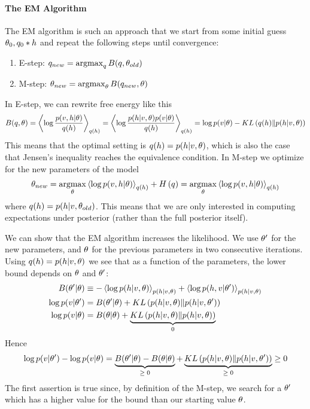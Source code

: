 \paragraph{The EM Algorithm}

The EM algorithm is such an approach that we start from some initial guess $\theta_0,q_0*h$ and repeat the following steps until convergence:
\begin{enumerate}
	\item E-step: $q_{new}=\argmax_qB(q,\th_{old})$
	\item M-step: $\th_{new}=\argmax_\th B(q_{new},\th)$
\end{enumerate}
In E-step, we can rewrite free energy like this
\begin{align*}
	B(q,\theta)=\left\langle\log\frac{p(v,h|\theta)}{q(h)}\right\rangle_{q(h)}=\left\langle\log\frac{p(h|v,\theta)p(v|\theta)}{q(h)}\right\rangle_{q(h)}=\log p(v|\theta)-KL\left(q(h)\|p(h|v,\theta)\right)
\end{align*}
This means that the optimal setting is $q(h)=p(h|v,\theta)$, which is also the case that Jensen's inequality reaches the equivalence condition. In M-step we optimize for the new parameters of the model
\begin{align*}
	\th_{new}=\argmax_\th\vecx{\log p(v,h|\th)}_{q(h)}+\H{q}=\argmax_\th\vecx{\log p(v,h|\th)}_{q(h)}
\end{align*}
where $q(h)=p(h|v,\theta_{old})$. This means that we are only interested in computing expectations under posterior (rather than the full posterior itself).

We can show that the EM algorithm increases the likelihood. We use $\theta'$ for the new parameters, and $\theta$ for the previous parameters in two consecutive iterations. Using $q(h)=p(h|v,\theta)$ we see that as a function of the parameters, the lower bound depends on $\theta$ and $\theta'$:
\begin{align*}
	B(\theta'|\theta)&\equiv-\left\langle\log p(h|v,\theta)\right\rangle_{p(h|v,\theta)}+\left\langle\log p(h,v|\theta')\right\rangle_{p(h|v,\theta)} \\
	\log p(v|\theta')&=B(\theta'|\theta)+KL\left(p(h|v,\theta)\|p(h|v,\theta')\right) \\
	\log p(v|\theta)&=B(\theta|\theta)+\underbrace{KL\left(p(h|v,\theta)\|p(h|v,\theta)\right)}_\text{$0$}
\end{align*}
Hence
\begin{align*}
	\log p(v|\theta')-\log p(v|\theta)=\underbrace{B(\theta'|\theta)-B(\theta|\theta)}_\text{$\geq 0$}+\underbrace{KL\left(p(h|v,\theta)\|p(h|v,\theta')\right)}_\text{$\geq 0$}\geq 0
\end{align*}
The first assertion is true since, by definition of the M-step, we search for a $\theta'$ which has a higher value for the bound than our starting value $\theta$.

